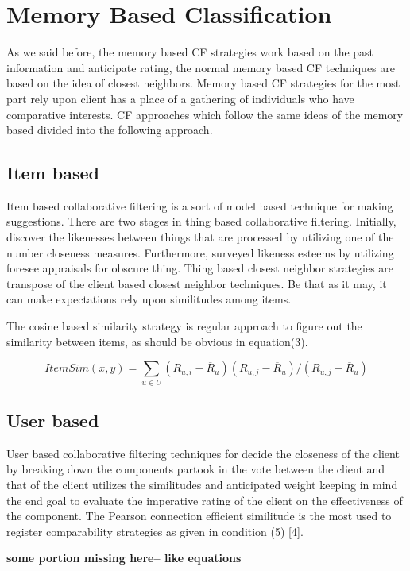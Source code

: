 \documentclass[10pt,conference]{IEEEtran}
\begin{document}
\section{Memory Based Classification}
As we said before, the memory based CF strategies work based on the past information and anticipate rating, the normal memory based CF techniques are based on the idea of closest neighbors. Memory based CF strategies for the most part rely upon client has a place of a gathering of individuals who have comparative interests. CF approaches which follow the same ideas of the memory based divided into the following approach.

\subsection{Item based}
Item based collaborative filtering is a sort of model based technique for making suggestions. There are two stages in thing based collaborative filtering. Initially, discover the likenesses between things that are processed by utilizing one of the number closeness measures. Furthermore, surveyed likeness esteems by utilizing foresee appraisals for obscure thing. Thing based closest neighbor strategies are transpose of the client based closest neighbor techniques. Be that as it may, it can make expectations rely upon similitudes among items. 

The cosine based similarity strategy is regular approach to figure out the similarity between items, as should be obvious in equation(3).

\begin{equation}
	ItemSim(x, y) = \sum_{u \in U} ({R_{u,i} - \overline{R}_u}) ({R_{u,j} - \overline{R}_u}) / ({R_{u,j} - \overline{R}_u})
\end{equation}


\subsection{User based}
User based collaborative filtering techniques for decide the closeness of the client by breaking down the components partook in the vote between the client and that of the client utilizes the similitudes and anticipated weight keeping in mind the end goal to evaluate the imperative rating of the client on the effectiveness of the component. The Pearson connection efficient similitude is the most used to register comparability strategies as given in condition (5) [4].

\textbf{some portion missing here-- like equations}
\end{document}
